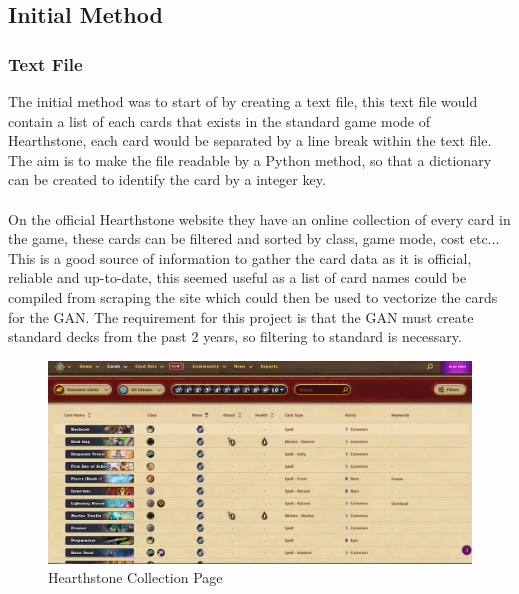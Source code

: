 \documentclass{report} %
\begin{document}
\subsection{Initial Method}
\subsubsection{Text File}
The initial method was to start of by creating a text file, this text file would contain a list of each cards that exists in the standard game mode of Hearthstone, each card would be separated by a line break within the text file. The aim is to make the file readable by a Python method, so that a dictionary can be created to identify the card by a integer key. \\
\\
\indent On the official Hearthstone website they have an online collection of every card in the game, these cards can be filtered and sorted by class, game mode, cost etc... This is a good source of information to gather the card data as it is official, reliable and up-to-date, this seemed useful as a list of card names could be compiled from scraping the site which could then be used to vectorize the cards for the GAN. The requirement for this project is that the GAN must create standard decks from the past 2 years, so filtering to standard is necessary. \\

\begin{figure}[h]
\centering
\includegraphics[width=1\textwidth]{collectionpage}
\caption{Hearthstone Collection Page\protect\footnotemark}
 \label{board}
\end{figure}
\end{document}
